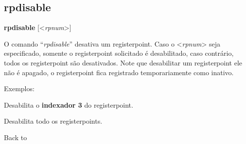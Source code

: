 \documentclass[letterpaper,10pt,brazil]{sphinxmanual}
\begin{document}
\subsection{rpdisable}
\label{debugger/registerpoints:debugger-command-rpdisable}\label{debugger/registerpoints:rpdisable}
\begin{DUlineblock}{0em}
\item[]
\begin{DUlineblock}{\DUlineblockindent}
\item[] \textbf{rpdisable} {[}\textless{}\emph{rpnum}\textgreater{}{]}
\item[] 
\end{DUlineblock}
\item[] O comando ``\emph{rpdisable}'' desativa um registerpoint. Caso o \textless{}\emph{rpnum}\textgreater{} seja especificado, somente o registerpoint solicitado é desabilitado, caso contrário, todos os registerpoint são desativados. Note que desabilitar um registerpoint ele não é apagado, o registerpoint fica registrado temporariamente como inativo.
\item[] 
\item[] Exemplos:
\item[] 
\item[]
\begin{DUlineblock}{\DUlineblockindent}
\item[] 
\item[] 
\end{DUlineblock}
\item[] Desabilita o \textbf{indexador 3} do registerpoint.
\item[] 
\item[]
\begin{DUlineblock}{\DUlineblockindent}
\item[] 
\item[] 
\end{DUlineblock}
\item[] Desabilita todo os registerpoints.
\item[] 
\item[] Back to {\hyperref[debugger/registerpoints:debugger\string-registerpoints\string-list]{}}
\end{DUlineblock}
\begin{quote}
\label{debugger/registerpoints:debugger-command-rpenable}\end{quote}
\end{document}
